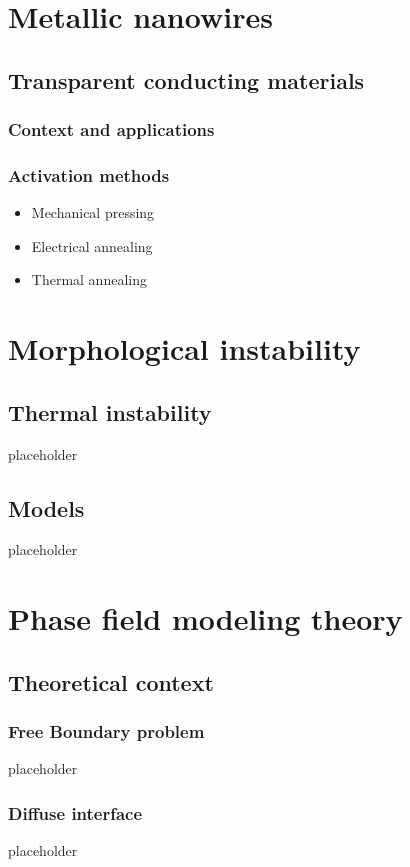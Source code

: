 \section{Metallic nanowires}
    \subsection{Transparent conducting materials}
        \subsubsection{Context and applications}
        \subsubsection{Activation methods}
            \begin{itemize}
                \item Mechanical pressing
                \item Electrical annealing
                \item Thermal annealing
            \end{itemize}
\section{Morphological instability}
    \subsection{Thermal instability}
        placeholder
    \subsection{Models}
        placeholder

\section{Phase field modeling theory}
    \subsection{Theoretical context}
        \subsubsection{Free Boundary problem}
            placeholder
        \subsubsection{Diffuse interface}
            placeholder
